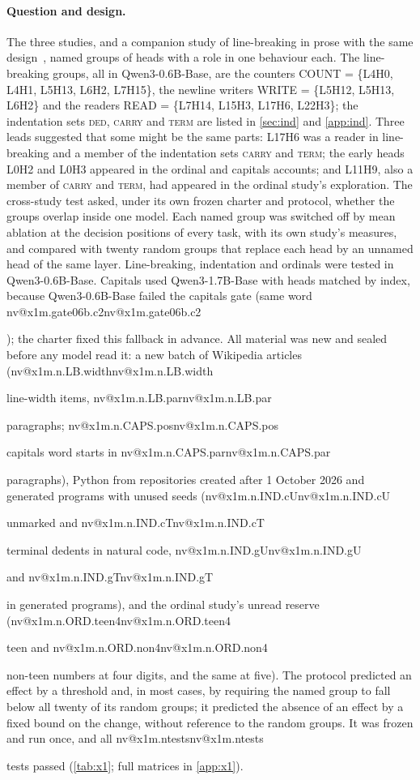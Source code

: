 \documentclass[11pt]{article}
\makeatletter
\newcommand{\nv}[1]{\ifcsname nv@#1\endcsname\csname nv@#1\endcsname\else\PackageError{numbers}{Unknown number key #1}{}\fi}
\newcommand{\hd}[2]{L#1H#2}
\newcommand{\ded}{\textsc{ded}}
\newcommand{\term}{\textsc{term}}
\newcommand{\carry}{\textsc{carry}}
\newcommand{\qsix}{Qwen3-0.6B-Base}
\newcommand{\qbig}{Qwen3-1.7B-Base}
\makeatother
\begin{document}
\paragraph{Question and design.} The three studies, and a companion study of line-breaking in prose with the same design~\citep{jeevash2026linebreaking}, named groups of heads with a role in one behaviour each. The line-breaking groups, all in \qsix{}, are the counters COUNT = \{\hd{4}{0}, \hd{4}{1}, \hd{5}{13}, \hd{6}{2}, \hd{7}{15}\}, the newline writers WRITE = \{\hd{5}{12}, \hd{5}{13}, \hd{6}{2}\} and the readers READ = \{\hd{7}{14}, \hd{15}{3}, \hd{17}{6}, \hd{22}{3}\}; the indentation sets \ded{}, \carry{} and \term{} are listed in \cref{sec:ind} and \cref{app:ind}. Three leads suggested that some might be the same parts: \hd{17}{6} was a reader in line-breaking and a member of the indentation sets \carry{} and \term{}; the early heads \hd{0}{2} and \hd{0}{3} appeared in the ordinal and capitals accounts; and \hd{11}{9}, also a member of \carry{} and \term{}, had appeared in the ordinal study's exploration. The cross-study test asked, under its own frozen charter and protocol, whether the groups overlap inside one model. Each named group was switched off by mean ablation at the decision positions of every task, with its own study's measures, and compared with twenty random groups that replace each head by an unnamed head of the same layer. Line-breaking, indentation and ordinals were tested in \qsix{}. Capitals used \qbig{} with heads matched by index, because \qsix{} failed the capitals gate (same word \nv{x1m.gate06b.c2}); the charter fixed this fallback in advance. All material was new and sealed before any model read it: a new batch of Wikipedia articles (\nv{x1m.n.LB.width} line-width items, \nv{x1m.n.LB.par} paragraphs; \nv{x1m.n.CAPS.pos} capitals word starts in \nv{x1m.n.CAPS.par} paragraphs), Python from repositories created after 1 October 2026 and generated programs with unused seeds (\nv{x1m.n.IND.cU} unmarked and \nv{x1m.n.IND.cT} terminal dedents in natural code, \nv{x1m.n.IND.gU} and \nv{x1m.n.IND.gT} in generated programs), and the ordinal study's unread reserve (\nv{x1m.n.ORD.teen4} teen and \nv{x1m.n.ORD.non4} non-teen numbers at four digits, and the same at five). The protocol predicted an effect by a threshold and, in most cases, by requiring the named group to fall below all twenty of its random groups; it predicted the absence of an effect by a fixed bound on the change, without reference to the random groups. It was frozen and run once, and all \nv{x1m.ntests} tests passed (\cref{tab:x1}; full matrices in \cref{app:x1}).
\end{document}
